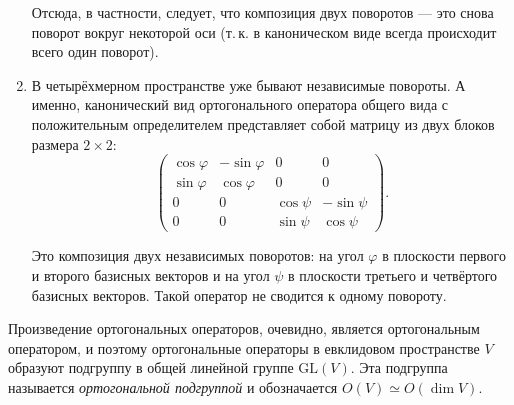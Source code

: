 \begin{example}
\begin{enumerate}
            Отсюда, в частности, следует, что композиция двух поворотов --- это снова поворот вокруг некоторой оси (т.\,к. в каноническом виде всегда происходит всего один поворот).
        \item В четырёхмерном пространстве уже бывают независимые повороты. А именно, канонический вид ортогонального оператора общего вида с положительным определителем представляет собой матрицу из двух блоков размера $2 \times 2$:
            \[
                \begin{pmatrix}
                    \cos\varphi & -\sin\varphi & 0 & 0\\
                    \sin\varphi & \cos\varphi & 0 & 0\\
                    0 & 0 & \cos\psi & -\sin\psi\\
                    0 & 0 & \sin\psi & \cos\psi
                \end{pmatrix}.
            \]

            Это композиция двух независимых поворотов: на угол $\varphi$ в плоскости первого и второго базисных векторов и на угол $\psi$ в плоскости третьего и четвёртого базисных векторов. Такой оператор не сводится к одному повороту.
    \end{enumerate}
\end{example}

Произведение ортогональных операторов, очевидно, является ортогональным оператором, и поэтому ортогональные операторы в евклидовом пространстве $V$ образуют подгруппу в общей линейной группе $\mathrm{GL}(V)$. Эта подгруппа называется \textit{ортогональной подгруппой} и обозначается $O(V) \simeq O(\dim V)$.

